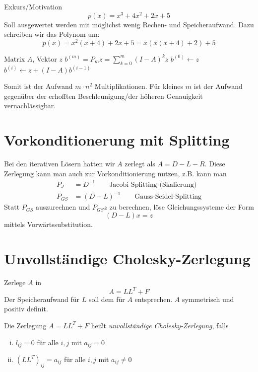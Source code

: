 \documentclass{mycourse}
\begin{document}
\begin{seg}{Exkurs/Motivation}
	\[
		p(x) = x^3 + 4x^2 + 2x + 5
	\]
	Soll ausgewertet werden mit möglichst wenig Rechen- und Speicheraufwand.
	Dazu schreiben wir das Polynom um:
	\[
		p(x) = x^2(x+4) + 2x + 5 = x(x(x+4)+2)+5
	\]

	\begin{alg}
		\label{alg:6.5}
		\begin{algorithmic}
			\Input Matrix $A$, Vektor $z$
			\Output $b^{(m)} = P_mz = \sum_{k=0}^m (I-A)^kz$
			\Statex
			\State $b^{(0)} \gets z$
			\State $b^{(i)} \gets z + (I-A)b^{(i-1)}$
			\EndFor
		\end{algorithmic}
	\end{alg}
	Somit ist der Aufwand $m\cdot n^2$ Multiplikationen.
	Für kleines $m$ ist der Aufwand gegenüber der erhofften Beschleunigung/der höheren Genauigkeit vernachlässigbar.
\end{seg}


\section{Vorkonditionerung mit Splitting}


Bei den iterativen Lösern hatten wir $A$ zerlegt als $A=D-L-R$.
Diese Zerlegung kann man auch zur Vorkonditionierung nutzen, z.B. kann man 
\begin{align*}
	P_J &= D^{-1} \qquad \text{Jacobi-Splitting (Skalierung)}\\
	P_{GS} &= (D-L)^{-1} \qquad \text{Gauss-Seidel-Splitting}
\end{align*}
Statt $P_{GS}$ auszurechnen und $P_{GS}z$ zu berechnen, löse Gleichungssysteme der Form
\[
	(D-L)x = z
\]
mittels Vorwärtssubstitution.


\section{Unvollständige Cholesky-Zerlegung}


Zerlege $A$ in
\[
	A=LL^T + F
\]
Der Speicheraufwand für $L$ soll dem für $A$ entsprechen.
$A$ symmetrisch und positiv definit.

Die Zerlegung $A=LL^T + F$ heißt \emph{unvollständige Cholesky-Zerlegung}, falls
\begin{enumerate}[(i)]
	\item
		$l_{ij} = 0$ für alle $i,j$ mit $a_{ij}=0$
	\item
		$(LL^T)_{ij} = a_{ij}$ für alle $i,j$ mit $a_{ij}\neq 0$
\end{enumerate}
\end{document}
